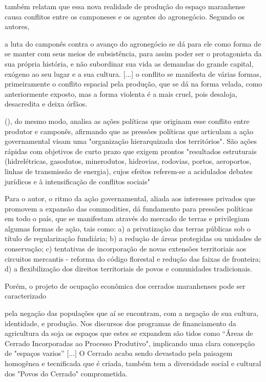  também relatam que essa nova realidade de produção do espaço maranhense causa conflitos entre os camponeses e os agentes do agronegócio. Segundo os autores, 

\begin{citacao}
a luta do camponês contra o avanço do agronegócio se dá para ele como forma de se manter com seus meios de subsistência, para assim poder ser o protagonista da sua própria história, e não subordinar sua vida as demandas do grande capital, exógeno ao seu lugar e a sua cultura. [...] o conflito se manifesta de várias formas, primeiramente o conflito espacial pela produção, que se dá na forma velada, como anteriormente exposto, mas a forma violenta é a mais cruel, pois desaloja, desacredita e deixa órfãos. \cite[p. 10]{rodrigues_alencar}
\end{citacao}

 (\citeyear{almeida}), do mesmo modo, analisa as ações políticas que originam esse conflito entre produtor e camponês, afirmando que as pressões políticas que articulam a ação governamental visam uma "organização hierarquizada dos territórios". São ações rápidas com objetivos de curto prazo que exigem prontos "resultados estruturais (hidrelétricas, gasodutos, minerodutos, hidrovias, rodovias, portos, aeroportos, linhas de transmissão de energia), cujos efeitos referem-se a acidulados debates jurídicos e à intensificação de conflitos sociais" \cite{almeida}

Para o autor, o ritmo da ação governamental, aliada aos interesses privados que promovem a expansão das commodities, dá fundamento para pressões políticas em todo o país, que se manifestam através do mercado de terras e privilegiam algumas formas de ação, tais como: a) a privatização das terras públicas sob o título de regularização fundiária; b) a redução de áreas protegidas ou unidades de conservação; c) tentativas de incorporação de novas extensões territoriais aos circuitos mercantis - reforma do código florestal e redução das faixas de fronteira; d) a flexibilização dos direitos territoriais de povos e comunidades tradicionais.

Porém, o projeto de ocupação econômica dos cerrados maranhenses pode ser caracterizado

\begin{citacao}
pela negação das populações que aí se encontram, com a negação de sua cultura, identidade, e produção. Nos discursos dos programas de financiamento da agricultura da soja os espaços que estes se expandem são tidos como “Áreas de Cerrado Incorporadas ao Processo Produtivo", implicando uma clara concepção de "espaços vazios” [...] O Cerrado acaba sendo devastado pela paisagem homogênea e tecnificada que é criada,  também tem a diversidade social e cultural dos "Povos do Cerrado" comprometida. \cite[p. 13]{rodrigues_alencar}
\end{citacao}

